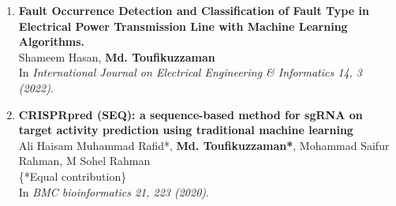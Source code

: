 \begin{enumerate}
    \item \textbf{Fault Occurrence Detection and Classification of Fault Type in Electrical Power Transmission Line with Machine Learning Algorithms.}\\
    Shameem Hasan, \textbf{Md. Toufikuzzaman}\\
    In \textit{International Journal on Electrical Engineering \& Informatics 14, 3 (2022)}.  
    
    \item \textbf{CRISPRpred (SEQ): a sequence-based method for sgRNA on target activity prediction using traditional machine learning}\\
    Ali Haisam Muhammad Rafid*, \textbf{Md. Toufikuzzaman*}, Mohammad Saifur Rahman, M Sohel Rahman\\
    \{*Equal contribution\}\\
    In \textit{BMC bioinformatics 21, 223 (2020)}.  
\end{enumerate}

    

\endinput